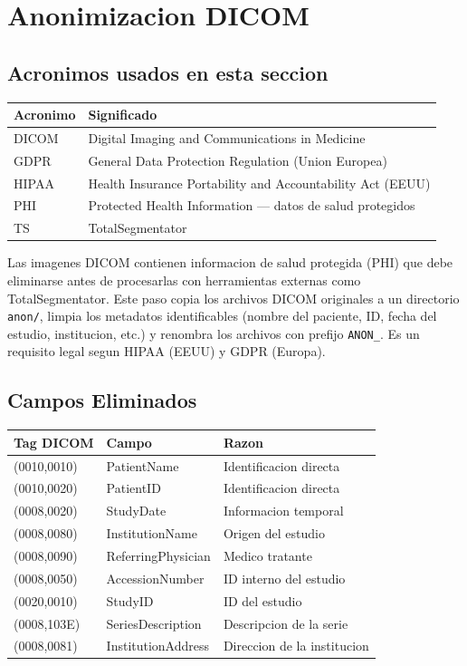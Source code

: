 \documentclass[12pt,a4paper]{article}
\begin{document}
\newpage

\section{Anonimizacion DICOM}
\label{sec:anonimizacion}

\subsection*{Acronimos usados en esta seccion}
\begin{tabular}{ll}
\toprule
\textbf{Acronimo} & \textbf{Significado} \\
\midrule
DICOM & Digital Imaging and Communications in Medicine \\
GDPR & General Data Protection Regulation (Union Europea) \\
HIPAA & Health Insurance Portability and Accountability Act (EEUU) \\
PHI & Protected Health Information --- datos de salud protegidos \\
TS & TotalSegmentator \\
\bottomrule
\end{tabular}

Las imagenes DICOM contienen informacion de salud protegida (PHI) que debe eliminarse antes de
procesarlas con herramientas externas como TotalSegmentator. Este paso copia los archivos DICOM
originales a un directorio \texttt{anon/}, limpia los metadatos identificables (nombre del
paciente, ID, fecha del estudio, institucion, etc.) y renombra los archivos con prefijo
\texttt{ANON\_}. Es un requisito legal segun HIPAA (EEUU) y GDPR (Europa).

\subsection{Campos Eliminados}

\begin{table}[H]
\centering
\begin{tabular}{l l l}
\toprule
\textbf{Tag DICOM} & \textbf{Campo} & \textbf{Razon} \\
\midrule
(0010,0010) & PatientName & Identificacion directa \\
(0010,0020) & PatientID & Identificacion directa \\
(0008,0020) & StudyDate & Informacion temporal \\
(0008,0080) & InstitutionName & Origen del estudio \\
(0008,0090) & ReferringPhysician & Medico tratante \\
(0008,0050) & AccessionNumber & ID interno del estudio \\
(0020,0010) & StudyID & ID del estudio \\
(0008,103E) & SeriesDescription & Descripcion de la serie \\
(0008,0081) & InstitutionAddress & Direccion de la institucion \\
\bottomrule
\end{tabular}
\end{table}
\end{document}
